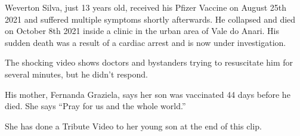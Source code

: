 Weverton Silva, just 13 years old, received his Pfizer Vaccine on August 25th
2021 and suffered multiple symptoms shortly afterwards. He collapsed and died on
October 8th 2021 inside a clinic in the urban area of Vale do Anari. His sudden
death was a result of a cardiac arrest and is now under investigation.

The shocking video shows doctors and bystanders trying to resuscitate him for
several minutes, but he didn’t respond.

His mother, Fernanda Graziela, says her son was vaccinated 44 days before he
died. She says “Pray for us and the whole world.”

She has done a Tribute Video to her young son at the end of this clip.

